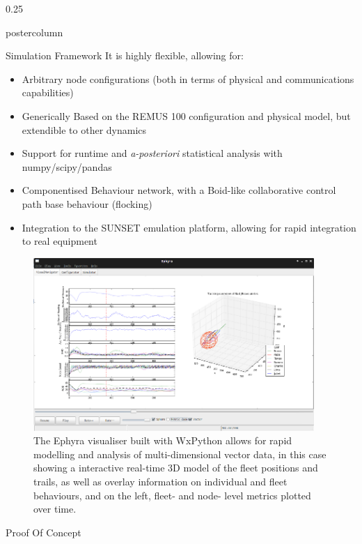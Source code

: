 \documentclass[final,hyperref={pdfpagelabels=false}]{beamer}
\def\colwidth{0.25\linewidth}
\begin{document}
\begin{frame}[fragile]
\begin{columns}[t]
\begin{column}{\colwidth}
\begin{beamercolorbox}[center,wd=\textwidth]{postercolumn}
\begin{minipage}[T]{.98\textwidth}
{\begin{block}{Simulation Framework}
              It is highly flexible, allowing for:
              \begin{itemize}
                \item Arbitrary node configurations (both in terms of physical and communications capabilities)
                \item Generically Based on the REMUS 100 configuration and physical model, but extendible to other dynamics\cite{Samad2011}
                \item Support for runtime and \emph{a-posteriori} statistical analysis with numpy/scipy/pandas\cite{Others}
                \item Componentised Behaviour network, with a Boid-like collaborative control path base behaviour (flocking)\cite{Reynolds1987a}
                \item Integration to the SUNSET emulation platform, allowing for rapid integration to real equipment\cite{Petrioli2012a}
              \end{itemize}
              \vspace{\lineskip}
              \begin{figure}
                \includegraphics[width=0.95\textwidth]{figures/ephyra_vis}
                \caption{The Ephyra visualiser built with WxPython allows for rapid modelling and analysis of multi-dimensional vector data, in this case showing a interactive real-time 3D model of the fleet positions and trails, as well as overlay information on individual and fleet behaviours, and on the left, fleet- and node- level metrics plotted over time.}
                \label{fig:Ephyra}
              \end{figure}
            \end{block}     
             \begin{block}{Proof Of Concept}

\end{block}}
\end{minipage}
\end{beamercolorbox}
\end{column}
\end{columns}
\end{frame}
\end{document}

